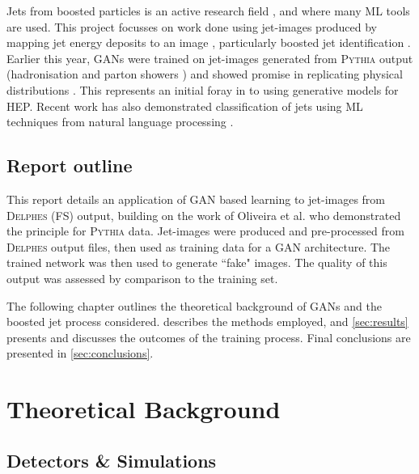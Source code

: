 \documentclass{report}
\newcommand{\pkg}[1]{\textsc{#1}}
\begin{document}
Jets from boosted particles is an active research field \cite{BOOST}, and where many ML tools are used.  This project focusses on work done using jet-images produced by mapping jet energy deposits to an image \cite{cogan2014jet,de2015jet}, particularly boosted jet identification \cite{Komiske:2016rsd,Almeida:2015jua,Baldi:2016fql}. Earlier this year, GANs were trained on jet-images generated from \pkg{Pythia} output (hadronisation and parton showers \cite{pythia}) and showed promise in replicating physical distributions \cite{de2017learning}. This represents an initial foray in to using generative models for HEP. Recent work has also demonstrated classification of jets using ML techniques from natural language processing \cite{louppe2017qcd}.

\section{Report outline}

This report details an application of GAN based learning to jet-images from \pkg{Delphes} (FS) output, building on the work of Oliveira et al. \cite{de2017learning} who demonstrated the principle for \pkg{Pythia} data. Jet-images were produced and pre-processed from \pkg{Delphes} output files, then used as training data for a GAN architecture. The trained network was then used to generate ``fake" images. The quality of this output was assessed by comparison to the training set. 

The following chapter outlines the theoretical background of GANs and the boosted jet process considered.  describes the methods employed, and \cref{sec:results} presents and discusses the outcomes of the training process. Final conclusions are presented in \cref{sec:conclusions}.
	 
\chapter{Theoretical Background}
\label{sec:theory}


\section{Detectors \& Simulations}
\label{sec:detector}
\end{document}
